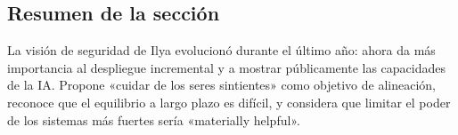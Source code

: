 \subsection{Resumen de la sección}

La visión de seguridad de Ilya evolucionó durante el último año: ahora da más importancia al despliegue incremental y a mostrar públicamente las capacidades de la IA. Propone «cuidar de los seres sintientes» como objetivo de alineación, reconoce que el equilibrio a largo plazo es difícil, y considera que limitar el poder de los sistemas más fuertes sería «materially helpful».

